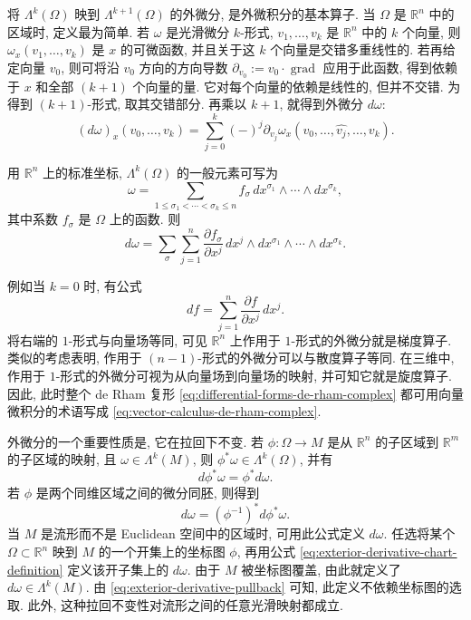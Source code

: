 {将 $\Lambda^k(\Omega)$ 映到 $\Lambda^{k+1}(\Omega)$ 的外微分, 是外微积分的基本算子. 当 $\Omega$ 是 $\mathbb R^n$ 中的区域时, 定义最为简单. 若 $\omega$ 是光滑微分 $k$-形式, $v_1,\ldots,v_k$ 是 $\mathbb R^n$ 中的 $k$ 个向量, 则 $\omega_x(v_1,\ldots,v_k)$ 是 $x$ 的可微函数, 并且关于这 $k$ 个向量是交错多重线性的. 若再给定向量 $v_0$, 则可将沿 $v_0$ 方向的方向导数 $\partial_{v_0}:=v_0\cdot\operatorname{grad}$ 应用于此函数, 得到依赖于 $x$ 和全部 $(k+1)$ 个向量的量. 它对每个向量的依赖是线性的, 但并不交错. 为得到 $(k+1)$-形式, 取其交错部分. 再乘以 $k+1$, 就得到外微分 $d\omega$:}
\[
(d\omega)_x(v_0,\ldots,v_k)=\sum_{j=0}^k(-)^j\partial_{v_j}\omega_x(v_0,\ldots,\widehat{v_j},\ldots,v_k).
\]

{用 $\mathbb R^n$ 上的标准坐标, $\Lambda^k(\Omega)$ 的一般元素可写为}
\[
\omega=\sum_{1\leq\sigma_1<\cdots<\sigma_k\leq n}f_\sigma\,dx^{\sigma_1}\wedge\cdots\wedge dx^{\sigma_k},
\]
{其中系数 $f_\sigma$ 是 $\Omega$ 上的函数. 则}
\begin{equation}\label{eq:exterior-derivative-coordinates}
d\omega=\sum_\sigma\sum_{j=1}^n\frac{\partial f_\sigma}{\partial x^j}\,dx^j\wedge dx^{\sigma_1}\wedge\cdots\wedge dx^{\sigma_k}.
\end{equation}

{例如当 $k=0$ 时, 有公式}
\[
df=\sum_{j=1}^n\frac{\partial f}{\partial x^j}\,dx^j.
\]
{将右端的 $1$-形式与向量场等同, 可见 $\mathbb R^n$ 上作用于 $1$-形式的外微分就是梯度算子. 类似的考虑表明, 作用于 $(n-1)$-形式的外微分可以与散度算子等同. 在三维中, 作用于 $1$-形式的外微分可视为从向量场到向量场的映射, 并可知它就是旋度算子. 因此, 此时整个 de Rham 复形 \eqref{eq:differential-forms-de-rham-complex} 都可用向量微积分的术语写成 \eqref{eq:vector-calculus-de-rham-complex}.}

{外微分的一个重要性质是, 它在拉回下不变. 若 $\phi:\Omega\to M$ 是从 $\mathbb R^n$ 的子区域到 $\mathbb R^m$ 的子区域的映射, 且 $\omega\in\Lambda^k(M)$, 则 $\phi^*\omega\in\Lambda^k(\Omega)$, 并有}
\begin{equation}\label{eq:exterior-derivative-pullback}
d\phi^*\omega=\phi^*d\omega.
\end{equation}
{若 $\phi$ 是两个同维区域之间的微分同胚, 则得到}
\begin{equation}\label{eq:exterior-derivative-chart-definition}
d\omega=(\phi^{-1})^*d\phi^*\omega.
\end{equation}
{当 $M$ 是流形而不是 Euclidean 空间中的区域时, 可用此公式定义 $d\omega$. 任选将某个 $\Omega\subset\mathbb R^n$ 映到 $M$ 的一个开集上的坐标图 $\phi$, 再用公式 \eqref{eq:exterior-derivative-chart-definition} 定义该开子集上的 $d\omega$. 由于 $M$ 被坐标图覆盖, 由此就定义了 $d\omega\in\Lambda^k(M)$. 由 \eqref{eq:exterior-derivative-pullback} 可知, 此定义不依赖坐标图的选取. 此外, 这种拉回不变性对流形之间的任意光滑映射都成立.}

